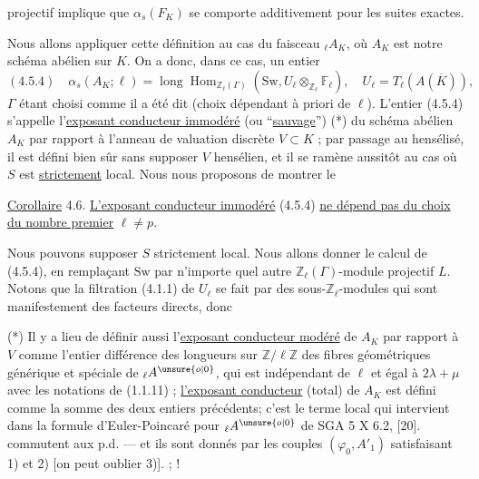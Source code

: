 projectif implique que $\alpha_s(F_K)$ se comporte additivement pour les suites exactes.

Nous allons appliquer cette définition au cas du faisceau ${}_\ell A_K$, où $A_K$ est notre schéma abélien sur $K$. On a donc, dans ce cas, un entier
\[
 (4.5.4)\quad\alpha_s(A_K;\ell)=\operatorname{long}\operatorname{Hom}_{\mathbb Z_\ell(\Gamma)}(\mathrm{Sw},U_\ell\otimes_{\mathbb Z_\ell}\mathbb F_\ell),\quad U_\ell=T_\ell(A(\overline K)),
\]
$\Gamma$ étant choisi comme il a été dit (choix dépendant à priori de $\ell$).
L'entier (4.5.4) s'appelle l'\uline{exposant conducteur immodéré} (ou ``\uline{sauvage}'') (*) du schéma abélien $A_K$ par rapport à l'anneau de valuation discrète $V\subset K$ ; par passage au hensélisé, il est défini bien sûr sans supposer $V$ hensélien, et il se ramène aussitôt au cas où $S$ est \uline{strictement} local. Nous nous proposons de montrer le

\uline{Corollaire} 4.6. \uline{L'exposant conducteur immodéré} (4.5.4) \uline{ne dépend pas du choix du nombre premier} $\ell\ne p$.

Nous pouvons supposer $S$ strictement local. Nous allons donner le calcul de (4.5.4), en remplaçant $\mathrm{Sw}$ par n'importe quel autre $\mathbb Z_\ell(\Gamma)$-module projectif $L$. Notons que la filtration (4.1.1) de $U_\ell$ se fait par des sous-$\mathbb Z_\ell$-modules qui sont manifestement des facteurs directs, donc

(*) Il y a lieu de définir aussi l'\uline{exposant conducteur modéré} de $A_K$ par rapport à $V$ comme l'entier différence des longueurs sur $\mathbb Z/\ell\mathbb Z$ des fibres géométriques générique et spéciale de ${}_\ell A^{\unsure{o|0}}$, qui est indépendant de $\ell$ et égal à $2\lambda+\mu$ avec les notations de (1.1.11) ; \uline{l'exposant conducteur} (total) de $A_K$ est défini comme la somme des deux entiers précédents; c'est le terme local qui intervient dans la formule d'Euler-Poincaré pour ${}_\ell A^{\unsure{o|0}}$ de SGA 5 X 6.2, [20].
commutent aux p.d. --- et ils sont donnés par les couples $(\varphi_0,A'_1)$ satisfaisant 1) et 2) [on peut oublier 3)]. ;  !

